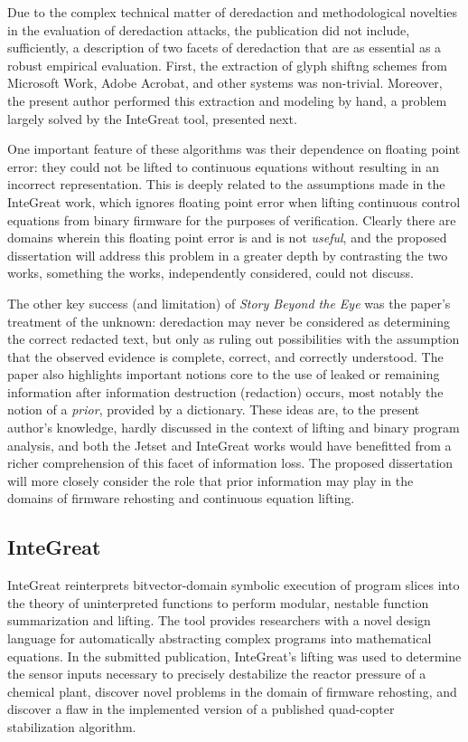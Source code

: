 Due to the complex technical matter of deredaction and methodological novelties in the evaluation of deredaction attacks, the publication did not include, sufficiently, a description of two facets of deredaction that are as essential as a robust empirical evaluation.
First, the extraction of glyph shiftng schemes from Microsoft Work, Adobe Acrobat, and other systems was non-trivial.
Moreover, the present author performed this extraction and modeling by hand, a problem largely solved by the InteGreat tool, presented next.

One important feature of these algorithms was their dependence on floating point error: they could not be lifted to continuous equations without resulting in an incorrect representation.
This is deeply related to the assumptions made in the InteGreat work, which ignores floating point error when lifting continuous control equations from binary firmware for the purposes of verification.
Clearly there are domains wherein this floating point error is and is not \emph{useful}, and the proposed dissertation will address this problem in a greater depth by contrasting the two works, something the works, independently considered, could not discuss.

The other key success (and limitation) of \emph{Story Beyond the Eye} was the paper's treatment of the unknown: deredaction may never be considered as determining the correct redacted text, but only as ruling out possibilities with the assumption that the observed evidence is complete, correct, and correctly understood.
The paper also highlights important notions core to the use of leaked or remaining information after information destruction (redaction) occurs, most notably the notion of a \emph{prior}, provided by a dictionary.
These ideas are, to the present author's knowledge, hardly discussed in the context of lifting and binary program analysis, and both the Jetset and InteGreat works would have benefitted from a richer comprehension of this facet of information loss.
The proposed dissertation will more closely consider the role that prior information may play in the domains of firmware rehosting and continuous equation lifting.

\subsection{InteGreat}

InteGreat reinterprets bitvector-domain symbolic execution of program slices into the theory of uninterpreted functions to perform modular, nestable function summarization and lifting.
The tool provides researchers with a novel design language for automatically abstracting complex programs into mathematical equations.
In the submitted publication, InteGreat's lifting was used to determine the sensor inputs necessary to precisely destabilize the reactor pressure of a chemical plant, discover novel problems in the domain of firmware rehosting, and discover a flaw in the implemented version of a published quad-copter stabilization algorithm.

